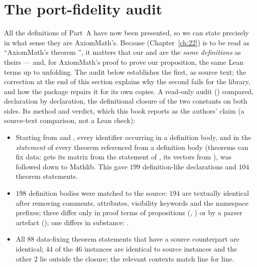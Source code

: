 \section{The port-fidelity audit}\label{ch21:sec:fidelityaudit}

All the definitions of Part~A have now been presented, so we can state precisely in what sense they are
AxiomMath's.  Because  (Chapter~\ref{ch:22}) is to be read as ``AxiomMath's theorem
'', it matters that our  and  are the \emph{same
definitions} as theirs --- and, for AxiomMath's proof to prove our proposition, the same Lean terms up to unfolding.  The audit
below establishes the first, as source text; the correction at the end of this section explains why the second fails for
the library, and how the package  repairs it for its own copies.  A read-only audit
() compared, declaration by
declaration, the definitional closure of the two constants on both sides.  Its method and verdict, which
this book reports as the authors' claim (a source-text comparison, not a Lean check):
\begin{itemize}
\item Starting from  and , every identifier occurring in a definition body, and in
  the \emph{statement} of every theorem referenced from a definition body (theorems can fix data: 
  gets its matrix from the statement of ,  its vectors from
  ), was followed down to Mathlib.  This gave $199$ definition-like
  declarations and $104$ theorem statements.
\item $198$ definition bodies were matched to the source: $194$ are textually identical after removing
  comments, attributes, visibility keywords and the namespace prefixes; three differ only in proof terms
  of propositions (, ) or by a parser artefact (); one differs in
  substance: .
\item All $88$ data-fixing theorem statements that have a source counterpart are identical; $44$ of the
  $46$ instances are identical to source instances and the other $2$ lie outside the closure; the relevant
   contexts match line for line.
\end{itemize}

